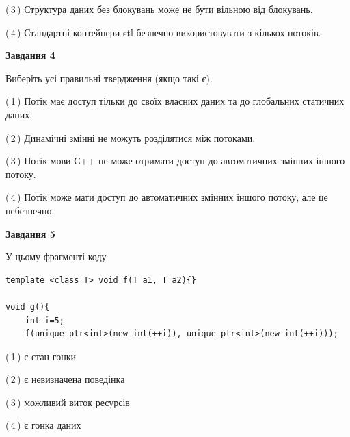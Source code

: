 \documentclass[12pt, ukrainian]{article}
\begin{document}
\begin {large}
{(\,3\,) Структура даних без блокувань може не бути вільною від блокувань.%

(\,4\,) Стандартні контейнери stl безпечно використовувати з кількох потоків.%



\begin{center}
\textbf{Завдання 4}
\end{center}
Виберіть усі правильні твердження (якщо такі є).\par
\vspace{2mm}

(\,1\,) Потік має доступ тільки до своїх власних даних та до глобальних статичних даних.%

(\,2\,) Динамічні змінні не можуть розділятися між потоками.%

(\,3\,) Потік мови С++ не може отримати доступ до автоматичних змінних іншого потоку.%

(\,4\,) Потік може мати доступ до автоматичних змінних іншого потоку, але це небезпечно.%



\begin{center}
\textbf{Завдання 5}
\end{center}
У цьому фрагменті коду
\begin{verbatim}
template <class T> void f(T a1, T a2){}

void g(){
    int i=5;
    f(unique_ptr<int>(new int(++i)), unique_ptr<int>(new int(++i)));
\end{verbatim}

(\,1\,) є стан гонки%

(\,2\,) є невизначена поведінка%

(\,3\,) можливий виток ресурсів%

(\,4\,) є гонка даних%


}
\end {large}
\end{document}
